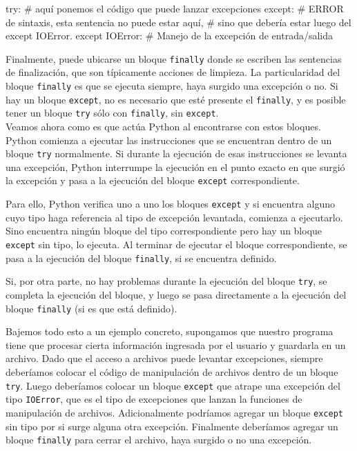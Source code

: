 \begin{codigo-python-sn}[numbers=none]
try:
	# aquí ponemos el código que puede lanzar excepciones
except:
	# ERROR de sintaxis, esta sentencia no puede estar aquí,
	# sino que debería estar luego del except IOError.
except IOError:
	# Manejo de la excepción de entrada/salida
\end{codigo-python-sn}

Finalmente, puede ubicarse un bloque \lstinline!finally! donde se escriben
las sentencias de finalización, que son típicamente acciones de limpieza.
La particularidad del bloque \lstinline!finally! es que se ejecuta siempre,
haya surgido una excepción o no. Si hay un bloque \lstinline!except!, no es
necesario que esté presente el \lstinline!finally!, y es posible tener un
bloque \lstinline!try! sólo con \lstinline!finally!, sin
\lstinline!except!. \\

Veamos ahora como es que actúa Python al encontrarse con estos bloques. Python
comienza a ejecutar las instrucciones que se encuentran dentro de un bloque
\lstinline!try! normalmente. Si durante la ejecución de esas instrucciones
se levanta una excepción, Python interrumpe la ejecución en el
punto exacto en que surgió la excepción y pasa a la ejecución del bloque
\lstinline!except! correspondiente.

Para ello, Python verifica uno a uno los bloques \lstinline!except! y si
encuentra alguno cuyo tipo haga referencia al tipo de excepción levantada,
comienza a ejecutarlo. Sino encuentra ningún bloque del tipo
correspondiente pero hay un bloque \lstinline!except! sin tipo, lo
ejecuta. Al terminar de ejecutar el bloque correspondiente, se pasa a la
ejecución del bloque \lstinline!finally!, si se encuentra definido.

Si, por otra parte, no hay problemas durante la ejecución del bloque
\lstinline!try!, se completa la ejecución del bloque, y luego se pasa
directamente a la ejecución del bloque \lstinline!finally! (si es que está
definido).

Bajemos todo esto a un ejemplo concreto, supongamos que nuestro programa
tiene que procesar cierta información ingresada por el usuario y guardarla
en un archivo. Dado que el acceso a archivos puede levantar
excepciones, siempre deberíamos colocar el código de manipulación de
archivos dentro de un bloque \lstinline!try!. Luego deberíamos
colocar un bloque \lstinline!except! que atrape una excepción del tipo
\lstinline!IOError!, que es el tipo de excepciones que lanzan la funciones
de manipulación de archivos. Adicionalmente podríamos agregar un bloque
\lstinline!except! sin tipo por si surge alguna otra excepción.  Finalmente
deberíamos agregar un bloque \lstinline!finally! para cerrar el archivo,
haya surgido o no una excepción.

